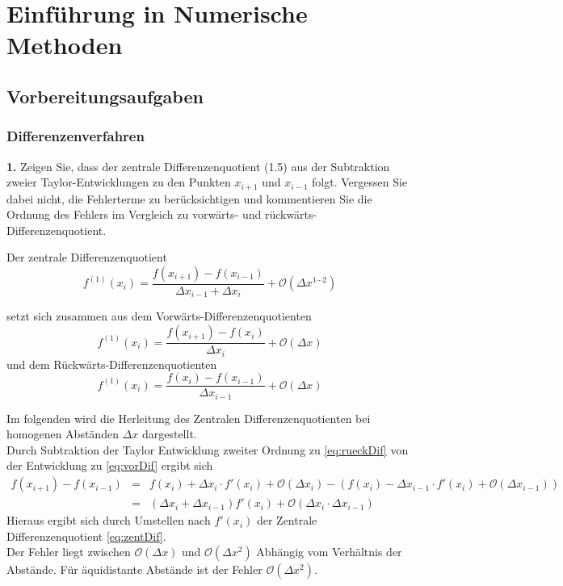 \documentclass[Protokollheft.tex]{subfiles}
\begin{document}
	\chapter{Einführung in Numerische Methoden}
	
	\section{Vorbereitungsaufgaben}
	{\subsection{Differenzenverfahren}}
	
	\begin{framed}
		\noindent \textbf{1.} Zeigen Sie, dass der zentrale Differenzenquotient (1.5) aus der Subtraktion zweier Taylor-Entwicklungen zu den Punkten $x_{i+1}$ und $x_{i-1}$ folgt. Vergessen Sie dabei nicht, die Fehlerterme zu berücksichtigen und kommentieren Sie die Ordnung des Fehlers im Vergleich zu vorwärts- und rückwärts-Differenzenquotient.\label{exer:diffquot}
	\end{framed}
	\noindent
	Der zentrale Differenzenquotient 
	\begin{equation}
	\label{eq:zentDif}
	f^{(1)}(x_i) = \frac{f(x_{i+1})-f(x_{i-1})}{\Delta x_{i-1}+\Delta x_i} + \mathcal{O}(\Delta x^{1\cdots2})
	\end{equation}
	
	setzt sich zusammen aus dem Vorwärts-Differenzenquotienten
	\begin{equation}
	\label{eq:vorDif}
	f^{(1)}(x_i) = \frac{f(x_{i+1})-f(x_{i})}{\Delta x_{i}} + \mathcal{O}(\Delta x)
	\end{equation}
	und dem Rückwärts-Differenzenquotienten
	\begin{equation}
	\label{eq:rueckDif}
	f^{(1)}(x_i) = \frac{f(x_{i})-f(x_{i-1})}{\Delta x_{i-1}} + \mathcal{O}(\Delta x)
	\end{equation}
	
	Im folgenden wird die Herleitung des Zentralen Differenzenquotienten bei homogenen Abständen $\Delta x$ dargestellt.\\
	Durch Subtraktion der Taylor Entwicklung zweiter Ordnung zu \ref{eq:rueckDif} von der Entwicklung zu \ref{eq:vorDif} ergibt sich 
	\begin{align}
		\label{eq:taylor}
		f(x_{i+1})-f(x_{i-1})& = &f(x_i)+\Delta x_i \cdot f'(x_i) + \mathcal{O} (\Delta x_i) 
		- (f(x_i) - \Delta x_{i-1}\cdot f'(x_i) + \mathcal{O} (\Delta x_{i-1})) \nonumber \\	
		& = & (\Delta x_i + \Delta x_{i-1}) f'(x_i) + \mathcal{O} (\Delta x_i \cdot \Delta x_{i-1})
	\end{align}
	Hieraus ergibt sich durch Umstellen nach $f'(x_i)$ der Zentrale Differenzenquotient \ref{eq:zentDif}. \\
	Der Fehler liegt zwischen $\mathcal{O}(\Delta x)$ und $\mathcal{O} (\Delta x^2)$ Abhängig vom Verhältnis der Abstände. Für äquidistante Abstände ist der Fehler $\mathcal{O} (\Delta x^2)$.
	
\end{document}
